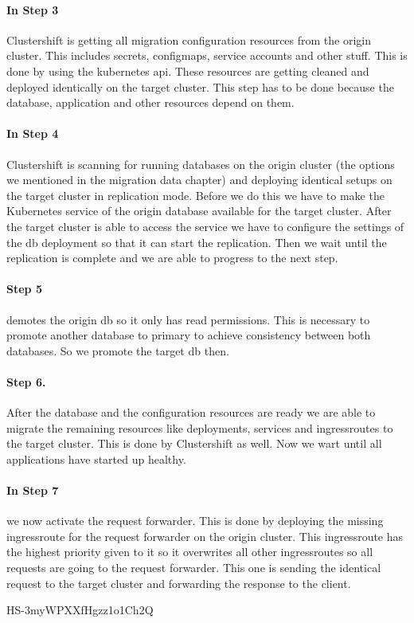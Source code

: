 \paragraph{In Step 3} Clustershift is getting all migration configuration resources from the origin cluster. This includes secrets, configmaps, service accounts and other stuff. This is done by using the kubernetes api. These resources are getting cleaned and deployed identically on the target cluster. This step has to be done because the database, application and other resources depend on them.
\paragraph{In Step 4} Clustershift is scanning for running databases on the origin cluster (the options we mentioned in the migration data chapter) and deploying identical setups on the target cluster in replication mode. Before we do this we have to make the Kubernetes service of the origin database available for the target cluster. After the target cluster is able to access the service we have to configure the settings of the db deployment so that it can start the replication. Then we wait until the replication is complete and we are able to progress to the next step.
\paragraph{Step 5 } demotes the origin db so it only has read permissions. This is necessary to promote another database to primary to achieve consistency between both databases. So we promote the target db then.
\paragraph{Step 6.} After the database and the configuration resources are ready we are able to migrate the remaining resources like deployments, services and ingressroutes to the target cluster. This is done by Clustershift as well. Now we wart until all applications have started up healthy.
\paragraph{In Step 7} we now activate the request forwarder. This is done by deploying the missing ingressroute for the request forwarder on the origin cluster. This ingressroute has the highest priority given to it so it overwrites all other ingressroutes so all requests are going to the request forwarder. This one is sending the identical request to the target cluster and forwarding the response to the client.

HS-3myWPXXfHgzz1o1Ch2Q
